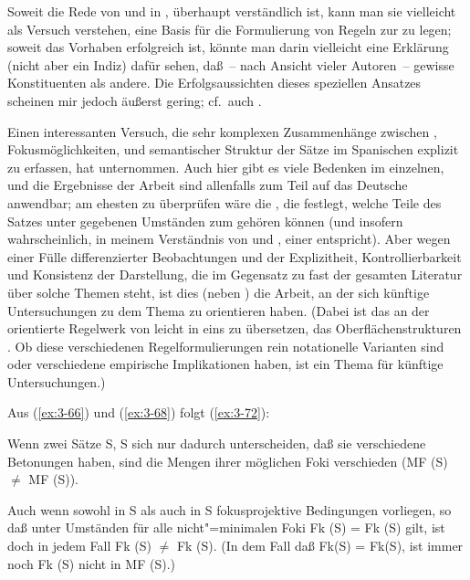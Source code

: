 \documentclass[output=paper]{langsci/langscibook}
\begin{document}
Soweit die Rede von  und
 in \citet{Sgall73}, \citet{Sgall77, Sgall78}
überhaupt verständlich ist, kann man sie vielleicht als Versuch verstehen, eine
Basis für die Formulierung von Regeln zur  zu legen; soweit das
Vorhaben erfolgreich ist, könnte man darin vielleicht eine Erklärung
(nicht aber ein Indiz) dafür sehen, daß~-- nach Ansicht vieler Autoren~--
gewisse Konstituenten  als andere. Die
Erfolgsaussichten dieses speziellen Ansatzes scheinen mir jedoch
äußerst gering; cf.\ auch \citet[348ff]{Dahl75}.

Einen interessanten Versuch, die sehr komplexen Zusammenhänge zwischen
, Fokusmöglichkeiten,  und semantischer Struktur
der Sätze im Spanischen explizit zu erfassen, hat \citet{Contreras76} unternommen. Auch hier gibt es viele Bedenken im einzelnen, und die Ergebnisse der Arbeit sind allenfalls zum Teil auf das Deutsche anwendbar; am ehesten zu überprüfen wäre die
, die festlegt, welche Teile des
Satzes unter gegebenen Umständen zum  gehören können (und
insofern wahrscheinlich, in meinem Verständnis von \citet{Sgall73} und \citet{Sgall77, Sgall78}, einer  entspricht). Aber wegen einer Fülle differenzierter Beobachtungen und der Explizitheit, Kontrollierbarkeit und Konsistenz der Darstellung,
die im Gegensatz zu fast der gesamten Literatur über solche Themen
steht, ist dies (neben \citealt{Jackendoff72}) die Arbeit, an der sich
künftige Untersuchungen zu dem Thema zu orientieren haben. (Dabei ist
das an der  orientierte Regelwerk von
\citet{Contreras76} leicht in eins zu übersetzen, das Oberflächenstrukturen . Ob diese verschiedenen Regelformulierungen rein notationelle Varianten sind oder
verschiedene empirische Implikationen haben, ist ein Thema für
künftige Untersuchungen.)

Aus (\ref{ex:3-66}) und (\ref{ex:3-68}) folgt (\ref{ex:3-72}):
\begin{exe}
\ex \label{ex:3-72}
Wenn zwei Sätze S, S sich nur dadurch unterscheiden, daß sie
verschiedene Betonungen haben, sind die Mengen ihrer möglichen Foki
verschieden (MF (S) $\neq$ MF (S)).
\end{exe}
Auch wenn sowohl in S als auch in S fokusprojektive
Bedingungen vorliegen, so daß unter Umständen für alle nicht"=minimalen Foki
Fk (S) = Fk (S) gilt, ist doch in jedem Fall Fk
(S) $\neq$ Fk (S). (In dem Fall daß Fk(S) = Fk(S),
ist immer noch Fk (S) nicht in MF (S).)
\end{document}
